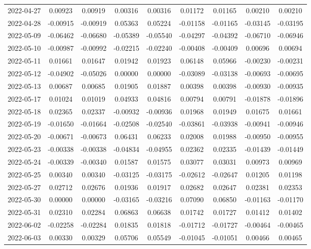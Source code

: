\begin{footnotesize}
\begin{longtable}{lcccccccc}
2022-04-27 & 0.00923 & 0.00919 & 0.00316 & 0.00316 & 0.01172 & 0.01165 & 0.00210 & 0.00210 \\
2022-04-28 & -0.00915 & -0.00919 & 0.05363 & 0.05224 & -0.01158 & -0.01165 & -0.03145 & -0.03195 \\
2022-05-09 & -0.06462 & -0.06680 & -0.05389 & -0.05540 & -0.04297 & -0.04392 & -0.06710 & -0.06946 \\
2022-05-10 & -0.00987 & -0.00992 & -0.02215 & -0.02240 & -0.00408 & -0.00409 & 0.00696 & 0.00694 \\
2022-05-11 & 0.01661 & 0.01647 & 0.01942 & 0.01923 & 0.06148 & 0.05966 & -0.00230 & -0.00231 \\
2022-05-12 & -0.04902 & -0.05026 & 0.00000 & 0.00000 & -0.03089 & -0.03138 & -0.00693 & -0.00695 \\
2022-05-13 & 0.00687 & 0.00685 & 0.01905 & 0.01887 & 0.00398 & 0.00398 & -0.00930 & -0.00935 \\
2022-05-17 & 0.01024 & 0.01019 & 0.04933 & 0.04816 & 0.00794 & 0.00791 & -0.01878 & -0.01896 \\
2022-05-18 & 0.02365 & 0.02337 & -0.00932 & -0.00936 & 0.01968 & 0.01949 & 0.01675 & 0.01661 \\
2022-05-19 & -0.01650 & -0.01664 & -0.02508 & -0.02540 & -0.03861 & -0.03938 & -0.00941 & -0.00946 \\
2022-05-20 & -0.00671 & -0.00673 & 0.06431 & 0.06233 & 0.02008 & 0.01988 & -0.00950 & -0.00955 \\
2022-05-23 & -0.00338 & -0.00338 & -0.04834 & -0.04955 & 0.02362 & 0.02335 & -0.01439 & -0.01449 \\
2022-05-24 & -0.00339 & -0.00340 & 0.01587 & 0.01575 & 0.03077 & 0.03031 & 0.00973 & 0.00969 \\
2022-05-25 & 0.00340 & 0.00340 & -0.03125 & -0.03175 & -0.02612 & -0.02647 & 0.01205 & 0.01198 \\
2022-05-27 & 0.02712 & 0.02676 & 0.01936 & 0.01917 & 0.02682 & 0.02647 & 0.02381 & 0.02353 \\
2022-05-30 & 0.00000 & 0.00000 & -0.03165 & -0.03216 & 0.07090 & 0.06850 & -0.01163 & -0.01170 \\
2022-05-31 & 0.02310 & 0.02284 & 0.06863 & 0.06638 & 0.01742 & 0.01727 & 0.01412 & 0.01402 \\
2022-06-02 & -0.02258 & -0.02284 & 0.01835 & 0.01818 & -0.01712 & -0.01727 & -0.00464 & -0.00465 \\
2022-06-03 & 0.00330 & 0.00329 & 0.05706 & 0.05549 & -0.01045 & -0.01051 & 0.00466 & 0.00465 \\

\end{longtable}
\end{footnotesize}

